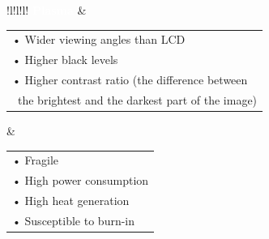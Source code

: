 \documentclass[12pt,fleqn]{book} %
\begin{document}
\begin{enumerate}
\begin{table}[h!]
\begin{tabular}{!{\color{white}\vrule}l!{\color{black}\vrule}l!{\color{white}\vrule}l!{\color{white}\vrule}}
 {}\textbf{\textcolor{white}{Plasma}}\textcolor{white}{}      & \begin{tabular}[c]{@{}>{\cellcolor[rgb]{0.859,0.898,0.945}}l@{}}• Wider viewing angles than LCD  \\• Higher black levels  \\• Higher contrast ratio (the difference between\\~the brightest and the darkest part of the image)\textbf{}\end{tabular}                                    & \begin{tabular}[c]{@{}>{\cellcolor[rgb]{0.859,0.898,0.945}}l@{}}• Fragile  \\• High power consumption  \\• High heat generation  \\• Susceptible to burn-in\textbf{}\end{tabular}                                                                 \\
\hline
\end{tabular}
\end{table}

    \end{enumerate}
\end{document}
